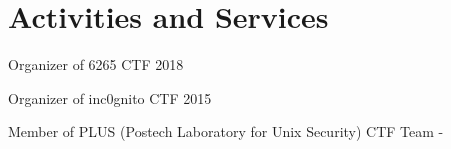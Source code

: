 \section*{Activities and Services}
\begin{description}
  \item Organizer of 6265 CTF 2018

  \item Organizer of inc0gnito CTF 2015

  \item Member of PLUS (Postech Laboratory for Unix Security) CTF Team 
  -
\end{description}
